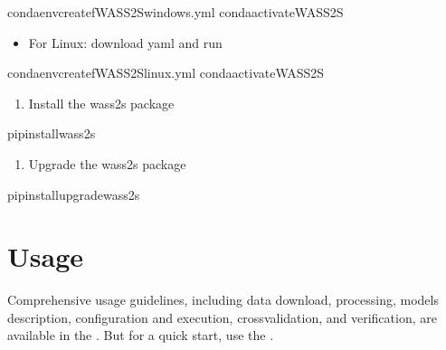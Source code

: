 \documentclass[letterpaper,10pt,english]{sphinxmanual}
\begin{document}
\begin{sphinxVerbatim}[commandchars=\\\{\}]
condaenvcreate\PYGZhy{}fWAS\PYGZus{}S2S\PYGZus{}windows.yml
condaactivateWASS2S
\end{sphinxVerbatim}
\begin{itemize}
\item {} 
\sphinxAtStartPar
For Linux: download yaml  and run

\end{itemize}

\begin{sphinxVerbatim}[commandchars=\\\{\}]
condaenvcreate\PYGZhy{}fWAS\PYGZus{}S2S\PYGZus{}linux.yml
condaactivateWASS2S
\end{sphinxVerbatim}
\begin{enumerate}
%
\setcounter{enumi}{1}
\item {} 
\sphinxAtStartPar
Install the wass2s package

\end{enumerate}

\begin{sphinxVerbatim}[commandchars=\\\{\}]
pipinstallwass2s
\end{sphinxVerbatim}
\begin{enumerate}
%
\setcounter{enumi}{2}
\item {} 
\sphinxAtStartPar
Upgrade the wass2s package

\end{enumerate}

\begin{sphinxVerbatim}[commandchars=\\\{\}]
pipinstall\PYGZhy{}\PYGZhy{}upgradewass2s
\end{sphinxVerbatim}

\sphinxstepscope


\chapter{Usage}
\label{\detokenize{Usage:usage}}\label{\detokenize{Usage::doc}}
\sphinxAtStartPar
Comprehensive usage guidelines, including data download, processing, models description, configuration and execution, cross\sphinxhyphen{}validation, and verification, are available in the .
But for a quick start, use the .
\end{document}
